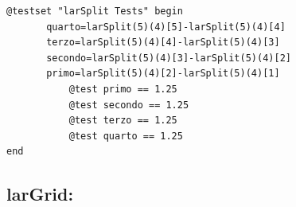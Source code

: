 \documentclass{article}
\begin{document}
\begin{flushleft}\small
\begin{list}{}{} \item
\begin{Verbatim}[tabsize=4]
@testset "larSplit Tests" begin
       quarto=larSplit(5)(4)[5]-larSplit(5)(4)[4]
       terzo=larSplit(5)(4)[4]-larSplit(5)(4)[3]
       secondo=larSplit(5)(4)[3]-larSplit(5)(4)[2]
       primo=larSplit(5)(4)[2]-larSplit(5)(4)[1]    
           @test primo == 1.25
           @test secondo == 1.25
           @test terzo == 1.25
           @test quarto == 1.25
end
\end{Verbatim}
\end{list}
\end{flushleft}

\subsection{larGrid:}
\end{document}
